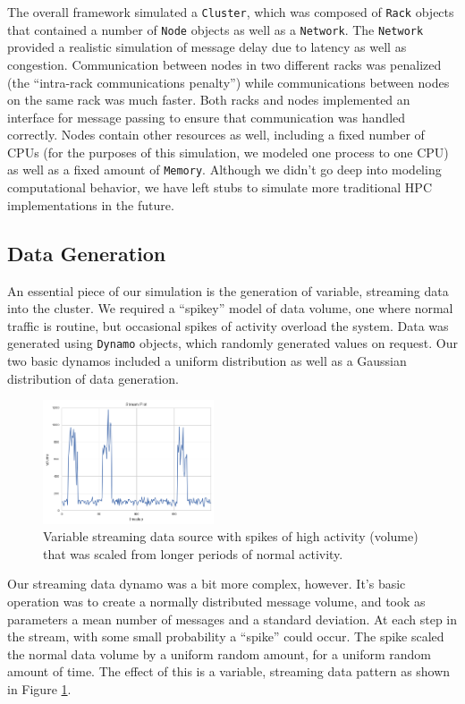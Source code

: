 \documentclass[conference,twocolumn,10pt]{IEEEtran}
\begin{document}
The overall framework simulated a \texttt{Cluster}, which was composed of \texttt{Rack} objects that contained a number of \texttt{Node} objects as well as a \texttt{Network}. The \texttt{Network} provided a realistic simulation of message delay due to latency as well as congestion. Communication between nodes in two different racks was penalized (the ``intra-rack communications penalty'') while communications between nodes on the same rack was much faster. Both racks and nodes implemented an interface for message passing to ensure that communication was handled correctly. Nodes contain other resources as well, including a fixed number of CPUs (for the purposes of this simulation, we modeled one process to one CPU) as well as a fixed amount of \texttt{Memory}. Although we didn't go deep into modeling computational behavior, we have left stubs to simulate more traditional HPC implementations in the future.

\subsection{Data Generation}

An essential piece of our simulation is the generation of variable, streaming data into the cluster. We required a ``spikey'' model of data volume, one where normal traffic is routine, but occasional spikes of activity overload the system. Data was generated using \texttt{Dynamo} objects, which randomly generated values on request. Our two basic dynamos included a uniform distribution as well as a Gaussian distribution of data generation.

\begin{figure}[!t]
    \centering
    \includegraphics[width=0.45\textwidth]{streaming}
    \caption{Variable streaming data source with spikes of high activity (volume) that was scaled from longer periods of normal activity. }
    \label{fig:streaming}
\end{figure}

Our streaming data dynamo was a bit more complex, however. It's basic operation was to create a normally distributed message volume, and took as parameters a mean number of messages and a standard deviation. At each step in the stream, with some small probability a ``spike'' could occur. The spike scaled the normal data volume by a uniform random amount, for a uniform random amount of time. The effect of this is a variable, streaming data pattern as shown in Figure \ref{fig:streaming}.
\end{document}
